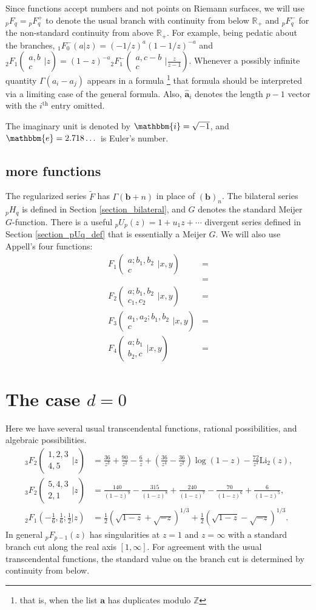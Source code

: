 \documentclass[12pt]{article}
\newcommand{\ee}[0] {\mathbbm{e}}
\newcommand{\ii}[0] {\mathbbm{i}}
\numberwithin{equation}{section}
\newcommand{\Head}[3] {{}_{#1}{#2}_{#3}}
\newcommand{\ArgS}[3] {( \begin{smallmatrix} #1 \\ #2 \end{smallmatrix} | {#3})}
\newcommand{\appellFoneS}[6] {F_1 \ArgS{{#1};{#2},{#3}}{#4}{{#5},{#6}}}
\newcommand{\appellFtwoS}[7] {F_2 \ArgS{{#1};{#2},{#3}}{{#4},{#5}}{{#6},{#7}}}
\newcommand{\appellFthreeS}[7] {F_3 \ArgS{{#1},{#2};{#3},{#4}}{{#5}}{{#6},{#7}}}
\newcommand{\appellFfourS}[6]    {F_4 \ArgS{{#1};{#2}}{{#3},{#4}}{{#5},{#6}}}
\newcommand{\FF}[6] {{}_{#1}{#2}_{#3} \left( \begin{array}{c} #4 \\ #5 \end{array} \Big| {#6}  \right)}
\newcommand{\FFs}[6] {{}_{#1}{#2}_{#3} ( \begin{smallmatrix} #4 \\ #5 \end{smallmatrix} | {#6}  )}
\newcommand{\FFes}[7] {{}_{#1}^{\,}{#2}_{#3}^{#4} ( \begin{smallmatrix} #5 \\ #6 \end{smallmatrix} | {#7} )}
\newcommand{\FFf}[5] {{}_{#1}{#2}_{#3} \left(#4 | {#5} \right)}
\newcommand{\bfa}[0] {\mathbf{a}}
\newcommand{\bfb}[0] {\mathbf{b}}
\begin{document}
Since functions accept numbers and not points on Riemann surfaces, we will use ${}_p F_{q} = {}_p F_{q}^{+}$ to denote the usual branch with continuity from below $\mathbb{R}_{+}$ and ${}_p^{\,} F_{q}^{-}$ for the non-standard continuity from above $\mathbb{R}_{+}$. For example, being pedatic about the branches, $\Head{1}{F}{0}^{-}(a|z) = (-1/z)^a (1-1/z)^{-a}$ and $\FFs{2}{F}{1}{a,b}{c}{z} = (1-z)^{-a} \FFes{2}{F}{1}{-}{a,c-b}{c}{\tfrac{z}{z-1}}$. Whenever a possibly infinite quantity $\Gamma(a_i-a_j)$ appears in a formula \footnote{that is, when the list $\bfa$ has duplicates modulo $\mathbb{Z}$} that formula should be interpreted via a limiting case of the general formula. Also, $\hat{\mathbf{a}}_i$ denotes the length $p-1$ vector with the $i^{\text{th}}$ entry omitted.

The imaginary unit is denoted by $\ii = \sqrt{-1}$, and $\ee = 2.718\dots$ is Euler's number.

\subsection{more functions}
The regularized series $\tilde{F}$ has $\Gamma(\bfb+n)$ in place of $(\bfb)_n$. The bilateral series $\Head{p}{H}{q}$ is defined in Section \ref{section_bilateral}, and $G$ denotes the standard Meijer $G$-function. There is a useful $\Head{p}{U}{p}(z) = 1 + u_1 z + \cdots$ divergent series defined in Section \ref{section_pUq_def} that is essentially a Meijer $G$. We will also use Appell's four functions:
\begin{align*}
\appellFoneS{a}{b_1}{b_2}{c}{x}{y} &=\\
&=\\
\appellFtwoS{a}{b_1}{b_2}{c_1}{c_2}{x}{y}  &=\\
\appellFthreeS{a_1}{a_2}{b_1}{b_2}{c}{x}{y}  &=\\
\appellFfourS{a}{b_1}{b_2}{c}{x}{y}  &=
\end{align*}

\section{The case $d=0$}
Here we have several usual transcendental functions, rational possibilities, and algebraic possibilities.
\begin{align*}
\FF{3}{F}{2}{1,2,3}{4,5}{z} &= \frac{36}{z^3}+\frac{90}{z^2}-\frac{6}{z}+\left
   (\frac{36}{z^4}-\frac{36}{z^2}\right) \log
   (1-z)-\frac{72}{z^3}
   \text{Li}_2(z)\text{,}\\
\FF{3}{F}{2}{5,4,3}{2,1}{z} &= \frac{140}{(1-z)^9}-\frac{315}{(1-z)^8}+\frac{240}{(1-z)^7}-\frac{70}{(1-z)^6}+\frac{6}{(1-z)^5}\text{,}\\
\FFf{2}{F}{1}{-\tfrac{1}{6}, \tfrac{1}{6};\tfrac{1}{2}}{z} &= \tfrac{1}{2} \left(\sqrt{1-z}+\sqrt{-z}\right)^{1/3}+\tfrac{1}{2} \left(\sqrt{1-z}-\sqrt{-z}\right)^{1/3}\text{.}
\end{align*}
In general ${}_{p}F_{p-1}(z)$ has singularities at $z=1$ and $z=\infty$ with a standard branch cut along the real axis $[1,\infty]$. For agreement with the usual transcendental functions, the standard value on the branch cut is determined by continuity from below.
\end{document}
